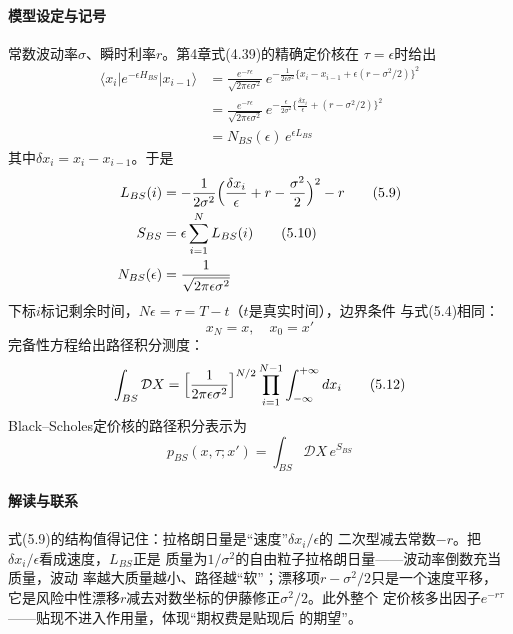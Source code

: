 \paragraph{模型设定与记号}
常数波动率$\sigma$、瞬时利率$r$。第4章式(4.39)的精确定价核在
$\tau=\epsilon$时给出
\begin{align*}
\langle x_{i}\vert e^{-\epsilon H_{BS}}\vert x_{i-1}\rangle
&=\frac{e^{-r\epsilon}}{\sqrt{2\pi\epsilon\sigma^{2}}}\,
e^{-\frac{1}{2\epsilon\sigma^{2}}\{x_{i}-x_{i-1}+\epsilon(r-\sigma^{2}/2)\}^{2}}\\
&=\frac{e^{-r\epsilon}}{\sqrt{2\pi\epsilon\sigma^{2}}}\,
e^{-\frac{\epsilon}{2\sigma^{2}}\{\frac{\delta x_{i}}{\epsilon}
+(r-\sigma^{2}/2)\}^{2}}\\
&=N_{BS}(\epsilon)\,e^{\epsilon L_{BS}}
\end{align*}
其中$\delta x_{i}=x_{i}-x_{i-1}$。于是
\begin{align*}
L_{BS}(i)&=-\frac{1}{2\sigma^{2}}\Bigl(\frac{\delta x_{i}}{\epsilon}
+r-\frac{\sigma^{2}}{2}\Bigr)^{2}-r
\tag{5.9}\\
S_{BS}&=\epsilon\sum_{i=1}^{N}L_{BS}(i)
\tag{5.10}\\
N_{BS}(\epsilon)&=\frac{1}{\sqrt{2\pi\epsilon\sigma^{2}}}
\end{align*}
下标$i$标记剩余时间，$N\epsilon=\tau=T-t$（$t$是真实时间），边界条件
与式(5.4)相同：
\begin{equation*}
x_{N}=x,\quad x_{0}=x'
\tag{5.11}
\end{equation*}
完备性方程给出路径积分测度：
\begin{equation*}
\int_{BS}\mathcal{D}X=\Bigl[\frac{1}{2\pi\epsilon\sigma^{2}}\Bigr]^{N/2}
\prod_{i=1}^{N-1}\int_{-\infty}^{+\infty}dx_{i}
\tag{5.12}
\end{equation*}
Black--Scholes定价核的路径积分表示为
\begin{equation*}
p_{BS}(x,\tau;x')=\int_{BS}\mathcal{D}X\,e^{S_{BS}}
\tag{5.13}
\end{equation*}

\paragraph{解读与联系}
式(5.9)的结构值得记住：拉格朗日量是“速度”$\delta x_{i}/\epsilon$的
二次型减去常数$-r$。把$\delta x_{i}/\epsilon$看成速度，$L_{BS}$正是
质量为$1/\sigma^{2}$的自由粒子拉格朗日量——波动率倒数充当质量，波动
率越大质量越小、路径越“软”；漂移项$r-\sigma^{2}/2$只是一个速度平移，
它是风险中性漂移$r$减去对数坐标的伊藤修正$\sigma^{2}/2$。此外整个
定价核多出因子$e^{-r\tau}$——贴现不进入作用量，体现“期权费是贴现后
的期望”。


